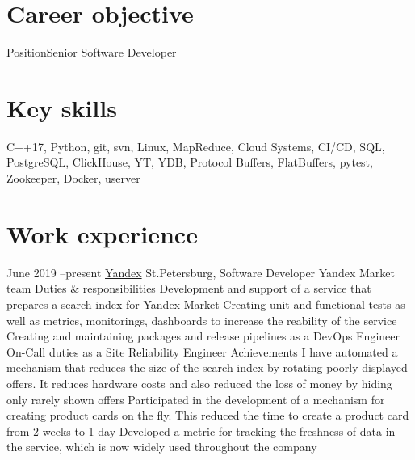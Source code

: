 \documentclass[11pt,a4paper]{moderncv}
\def\mark{{\small$\bullet$} }
\begin{document}
\maketitle

\section{Career objective}
\cvline
    {Position}{Senior Software Developer}

\section{Key skills}
\cvline
    {}
    {C++17, Python, git, svn, Linux, MapReduce, Cloud Systems, CI/CD, SQL, PostgreSQL, ClickHouse,
    YT, YDB, Protocol Buffers, FlatBuffers, pytest, Zookeeper, Docker, userver}

\section{Work experience}
\cventry
    {June 2019 --\newline present} %
    {\href{https://market.yandex.ru/}{Yandex}}
    {St.Petersburg, Software Developer}
    {Yandex Market team}
    {}
    {
        {\large Duties \& responsibilities}
        \newline \mark Development and support of a service that prepares a search index for Yandex Market
        \newline \mark Creating unit and functional tests as well as metrics, monitorings, dashboards to increase the reability of the service
        \newline \mark Creating and maintaining packages and release pipelines as a DevOps Engineer
        \newline \mark On-Call duties as a Site Reliability Engineer
        \newline
        {\large Achievements}
        \newline \mark I have automated a mechanism that reduces the size of the search index by rotating poorly-displayed offers.
        It reduces hardware costs and also reduced the loss of money by hiding only rarely shown offers
        \newline \mark Participated in the development of a mechanism for creating product cards on the fly.
        This reduced the time to create a product card from 2 weeks to 1 day
        \newline \mark Developed a metric for tracking the freshness of data in the service, which is now widely used throughout the company
    }
\end{document}
